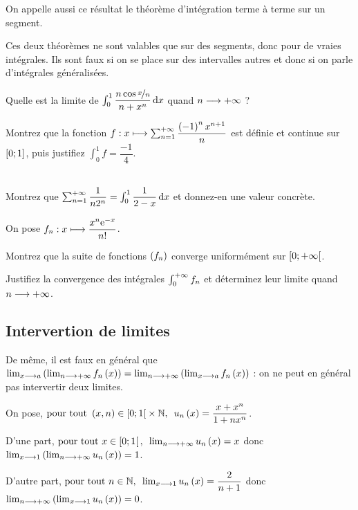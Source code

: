 On appelle aussi ce résultat le théorème d'intégration terme à terme sur un segment.

\begin{rem}
Ces deux théorèmes ne sont valables que sur des segments, donc pour de vraies intégrales. Ils sont faux si on se place sur des intervalles autres et donc si on parle d'intégrales généralisées.
\end{rem}

\begin{exo}
Quelle est la limite de \(\int_0^1\dfrac{n\cos\nicefrac{x}{n}}{n+x^n}\odif{x}\) quand \(n\longrightarrow+\infty\) ?
\end{exo}

\begin{exo}
Montrez que la fonction \(f:x\longmapsto\sum_{n=1}^{+\infty}\dfrac{\left(-1\right)^nx^{n+1}}{n}\) est définie et continue sur \(\left[0;1\right]\), puis justifiez \(\int_0^1f=\dfrac{-1}{4}\).
\end{exo}

\begin{exo}~\\
Montrez que \(\sum_{n=1}^{\pinf}\dfrac{1}{n2^n}=\int_0^1\dfrac{1}{2-x}\odif{x}\) et donnez-en une valeur concrète.
\end{exo}

\begin{exo}
On pose \(f_n:x\longmapsto\dfrac{x^n\mathrm{e}^{-x}}{n!}\).

Montrez que la suite de fonctions \(\left(f_n\right)\) converge uniformément sur \(\left[0;+\infty\right[\).

Justifiez la convergence des intégrales \(\int_0^{+\infty}f_n\) et déterminez leur limite quand \(n\longrightarrow+\infty\).
\end{exo}

\subsection{Intervertion de limites}

De même, il est faux en général que \(\lim_{x\longrightarrow a}\left(\lim_{n\longrightarrow+\infty}f_n\left(x\right)\right)=\lim_{n\longrightarrow+\infty}\left(\lim_{x\longrightarrow a}f_n\left(x\right)\right)\) : on ne peut en général pas intervertir deux limites.

\begin{ex}
On pose, \(\quantifs{\tpt\paren{x,n}\in\intervie{0}{1}\times\N}u_n\paren{x}=\dfrac{x+x^n}{1+nx^n}\).

D'une part, \(\quantifs{\tpt x\in\intervie{0}{1}}\lim_{n\to\pinf}u_n\paren{x}=x\) donc \(\lim_{x\longrightarrow1}\left(\lim_{n\longrightarrow+\infty}u_n\left(x\right)\right)=1\).

D'autre part, \(\quantifs{\tpt n\in\N}\lim_{x\to1}u_n\paren{x}=\dfrac{2}{n+1}\) donc \(\lim_{n\longrightarrow+\infty}\left(\lim_{x\longrightarrow1}u_n\left(x\right)\right)=0\).
\end{ex}

